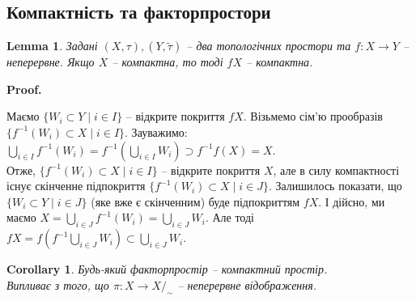 \documentclass[a4paper, 10pt]{article}
\makeatletter
\theoremstyle{theoremdd}
\newtheorem{lemma}[theorem]{Lemma}
\newtheorem{corollary}[theorem]{Corollary}
\DeclareMathOperator{\Cl}{Cl}
\renewenvironment{proof}[1][Proof.\\]{\par
\pushQED{\hfill \qed}%
\normalfont \topsep6\p@\@plus6\p@\relax
\trivlist
\item\relax
{\bfseries
#1\@addpunct{.}}\hspace\labelsep\ignorespaces
}{%
\popQED\endtrivlist\@endpefalse
}
\makeatother
\begin{document}
\subsection{Компактність та факторпростори}
\begin{lemma}
Задані $(X,\tau),(Y,\tilde{\tau})$ -- два топологічних простори та $f \colon X \to Y$ -- неперервне. Якщо $X$ -- компактна, то тоді $fX$ -- компактна.
\end{lemma}

\begin{proof}
Маємо $\{W_i \subset Y \mid i \in I\}$ -- відкрите покриття $fX$. Візьмемо сім'ю прообразів $\{f^{-1}(W_i) \subset X \mid i \in I\}$. Зауважимо:\\
$\displaystyle\bigcup_{i \in I} f^{-1}(W_i) = f^{-1} \left( \bigcup_{i \in I} W_i \right) \supset f^{-1} f(X) = X$.\\
Отже, $\{f^{-1}(W_i) \subset X \mid i \in I\}$ -- відкрите покриття $X$, але в силу компактності існує скінченне підпокриття $\{f^{-1}(W_i) \subset X \mid i \in J\}$. Залишилось показати, що $\{W_i \subset Y \mid i \in J\}$ (яке вже є скінченним) буде підпокриттям $fX$. І дійсно, ми маємо $X = \displaystyle\bigcup_{i \in J} f^{-1}(W_i) = \bigcup_{i \in J} W_i$. Але тоді \\ $fX = \displaystyle f\left( f^{-1} \bigcup_{i \in J} W_i \right) \subset \bigcup_{i \in J} W_i$.
\end{proof}

\iffalse
\begin{corollary}
Задано $(X,\tau)$ -- компактний простір та $f \colon X \to \mathbb{R}$ -- неперервна функція. Тоді $f$ -- обмежена та досягає найменшого та найбільшого значень (якщо $X \neq \emptyset$).
\end{corollary}

\begin{proof}
Дійсно, $X$ -- компактна, а тому за лемою, $fX$ -- компактна. Звідси з курса мат аналізу, $fX$ обмежена та замкнена (лема Гайне-Бореля). Якщо $X \neq \emptyset$, то тоді $fX$ має супремум. $\sup A \in \Cl(A)$, якщо $A \subset \mathbb{R}$ непорожня та обмежена зверху
\end{proof}
\fi

\begin{corollary}
Будь-який факторпростір -- компактний простір.\\
\textit{Випливає з того, що $\pi \colon X \to X/_\sim$ -- неперервне відображення.}
\end{corollary}
\end{document}
